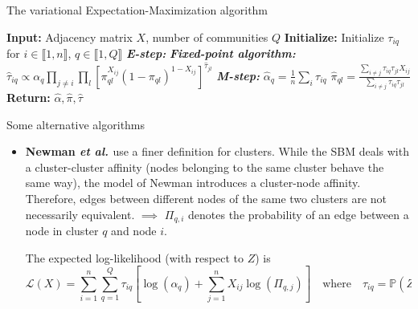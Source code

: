 \documentclass[final]{beamer}
\newlength{\colwidth}
\begin{document}
\begin{frame}[t]
\begin{columns}[t]
\begin{column}{\colwidth}
\begin{alertblock}{The variational Expectation-Maximization algorithm}
\begin{minipage}{.9\linewidth}
\begin{algorithm}[H]
\begin{algorithmic}[1]
              \State \textbf{Input:} Adjacency matrix $X$, number of communities $Q$
              \State \textbf{Initialize:} Initialize $\tau_{iq}$ for $i \in \llbracket 1, n \rrbracket$, $q \in \llbracket 1, Q \rrbracket$
              \State \textbf{\emph{E-step:}}
              \State \textbf{\emph{Fixed-point algorithm:}}
              \State $\hat{\tau}_{iq} \propto \alpha_q \prod_{j\neq i}\prod_l \left[\pi_{ql}^{X_{ij}}(1-\pi_{ql})^{1-X_{ij}}\right]^{\hat{\tau}_{jl}}$
              \EndFor
              \EndFor
              \State \textbf{\emph{M-step:}}
              \State $\hat{\alpha}_q = \frac{1}{n}\sum_{i} \tau_{iq}$ 
              \State $\hat{\pi}_{ql} = \frac{\sum_{i\neq j} \tau_{iq}\tau_{jl}X_{ij}}{\sum_{i\neq j} \tau_{iq}\tau_{jl}}$ 
              \EndFor
              \EndFor
              \EndWhile
              \State \textbf{Return:} $\hat{\alpha}, \hat{\pi}, \hat{\tau}$
            \end{algorithmic}
          \end{algorithm}
        \end{minipage}

      \end{alertblock}

      \begin{block}{Some alternative algorithms}
        \begin{itemize}
          \item \justifying \textbf{Newman \textit{et al.} \cite{newman}} use a finer definition for clusters. While the SBM deals with a cluster-cluster affinity (nodes belonging to the same cluster behave the same way), the model of Newman introduces a cluster-node affinity. Therefore, edges between different nodes of the same two clusters are not necessarily equivalent. $\implies$ $\Pi_{q,i}$ denotes the probability of an edge between a node in cluster $q$ and node $i$.

                The expected log-likelihood (with respect to $Z$) is
                \begin{equation*}
                  \mathcal{L}(X) = \sum_{i=1}^n\sum_{q=1}^Q \tau_{iq} \left[ \log(\alpha_q) + \sum_{j=1}^n X_{ij} \log(\Pi_{q, j}) \right] \quad \text{where} \quad \tau_{iq} = \mathbb{P}(Z_{iq} = 1 | X, \alpha, \Pi).
                \end{equation*}


\end{itemize}
\end{block}
\end{column}
\end{columns}
\end{frame}
\end{document}
